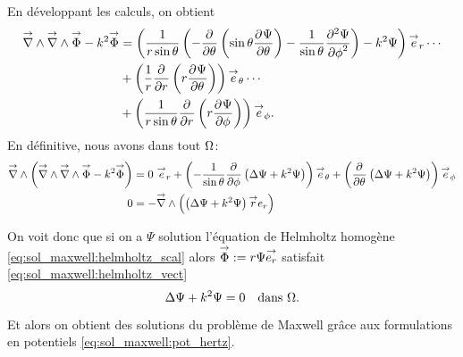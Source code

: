 %
En développant les calculs, on obtient
\begin{align*}
  \vrot \vrot \vect \Phi - k^2 \vect \Phi
  &= \left(\frac{1}{r\sin\theta}\left(-\ddr{\theta}{}\left(\sin\theta\ddr{\theta}{\Psi}\right)-\frac{1}{\sin\theta}\ddr[2]{\phi}{\Psi}\right)-k^2\Psi\right)\vect e_r \cdots \\
  &+ \left(\frac{1}{r}\ddr{r}{}\left(r\ddr{\theta}{\Psi}\right)\right)\vect e_\theta \cdots \\
  &+ \left(\frac{1}{r\sin\theta}\ddr{r}{}\left(r\ddr{\phi}{\Psi}\right)\right)\vect e_\phi.
\end{align*}
En définitive, nous avons dans tout \(\OO\):
\begin{align*}
  \vrot\left(\vrot \vrot \vect \Phi - k^2 \vect \Phi\right)
  &= %
   0 ~ \vect e_r
  + \left(-\frac{1}{\sin\theta}\ddr{\phi}{}\left(\Delta \Psi + k^2 \Psi \right)\right)\vect e_\theta
  + \left(\ddr{\theta}{}\left(\Delta \Psi + k^2 \Psi \right)\right)\vect e_\phi
  \\
  0 &= -\vrot \left( \left(\Delta \Psi + k^2\Psi\right)\vect r e_r\right)
\end{align*}

On voit donc que si on a \(\Psi\) solution l'équation de Helmholtz homogène  \eqref{eq:sol_maxwell:helmholtz_scal} alors  \(\vect \Phi:=r\Psi\vect{e_r}\) satisfait \eqref{eq:sol_maxwell:helmholtz_vect}
\begin{equation}
  \label{eq:sol_maxwell:helmholtz_scal}
   \Delta \Psi + k^2\Psi = 0 \quad \text{dans \(\OO\)}.
\end{equation}

Et alors on obtient des solutions du problème de Maxwell grâce aux formulations en potentiels \eqref{eq:sol_maxwell:pot_hertz}.

